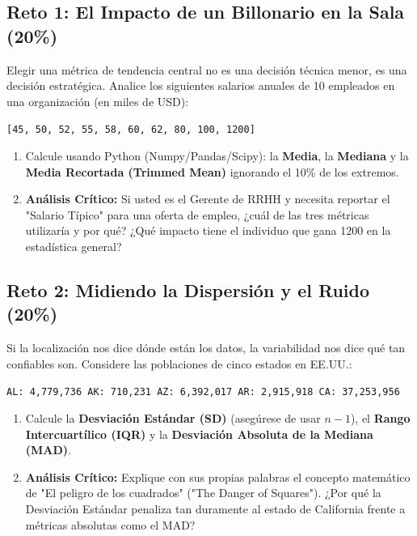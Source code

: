 \documentclass[12pt,a4paper]{article}
\begin{document}
\subsection*{Reto 1: El Impacto de un Billonario en la Sala (20\%)}
Elegir una métrica de tendencia central no es una decisión técnica menor, es una decisión estratégica. Analice los siguientes salarios anuales de 10 empleados en una organización (en miles de USD):
\begin{center}
    \texttt{[45, 50, 52, 55, 58, 60, 62, 80, 100, 1200]}
\end{center}
\begin{enumerate}
    \item Calcule usando Python (Numpy/Pandas/Scipy): la \textbf{Media}, la \textbf{Mediana} y la \textbf{Media Recortada (Trimmed Mean)} ignorando el 10\% de los extremos.
    \item \textbf{Análisis Crítico:} Si usted es el Gerente de RRHH y necesita reportar el "Salario Típico" para una oferta de empleo, ¿cuál de las tres métricas utilizaría y por qué? ¿Qué impacto tiene el individuo que gana 1200 en la estadística general?
\end{enumerate}

\subsection*{Reto 2: Midiendo la Dispersión y el Ruido (20\%)}
Si la localización nos dice dónde están los datos, la variabilidad nos dice qué tan confiables son. Considere las poblaciones de cinco estados en EE.UU.:
\begin{center}
    \texttt{AL: 4,779,736 \quad AK: 710,231 \quad AZ: 6,392,017 \quad AR: 2,915,918 \quad CA: 37,253,956}
\end{center}
\begin{enumerate}
    \item Calcule la \textbf{Desviación Estándar (SD)} (asegúrese de usar $n-1$), el \textbf{Rango Intercuartílico (IQR)} y la \textbf{Desviación Absoluta de la Mediana (MAD)}.
    \item \textbf{Análisis Crítico:} Explique con sus propias palabras el concepto matemático de "El peligro de los cuadrados" ("The Danger of Squares"). ¿Por qué la Desviación Estándar penaliza tan duramente al estado de California frente a métricas absolutas como el MAD?
\end{enumerate}
\end{document}
